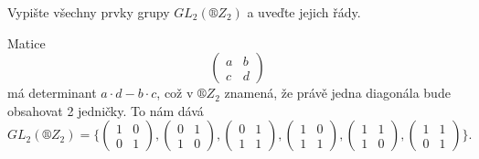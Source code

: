 \documentclass[12pt]{article}                   %
\begin{document}
\pagebreak

    \begin{priklad}[5.2]
        Vypište všechny prvky grupy $GL_2(®Z_2)$ a uveďte jejich řády.

        \begin{reseni}
            Matice
            $$ \begin{pmatrix} a & b \\ c & d \end{pmatrix} $$
            má determinant $a·d - b·c$, což v $®Z_2$ znamená, že právě jedna diagonála bude obsahovat 2 jedničky. To nám dává
            $$ GL_2(®Z_2) = \{\begin{pmatrix} 1 & 0 \\ 0 & 1 \end{pmatrix}, \begin{pmatrix} 0 & 1 \\ 1 & 0 \end{pmatrix}, \begin{pmatrix} 0 & 1 \\ 1 & 1 \end{pmatrix}, \begin{pmatrix} 1 & 0 \\ 1 & 1 \end{pmatrix}, \begin{pmatrix} 1 & 1 \\ 1 & 0 \end{pmatrix}, \begin{pmatrix} 1 & 1 \\ 0 & 1 \end{pmatrix}\}. $$


\end{reseni}
\end{priklad}
\end{document}

